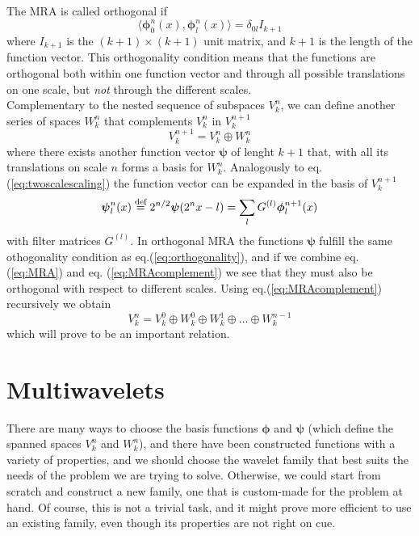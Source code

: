 \noindent
The MRA is called orthogonal if 
\begin{equation}
	\label{eq:orthogonality}
	\langle \boldsymbol{\phi}_0^n(x), \boldsymbol{\phi}_l^n(x) \rangle = 
	\delta_{0l}I_{k+1}
\end{equation}
where $I_{k+1}$ is the $(k+1) \times (k+1)$ unit matrix, and $k+1$ is the 
length of the function vector. This orthogonality condition means that the 
functions are orthogonal both within one function
vector and through all possible translations on one scale, but \emph{not} 
through the different scales.\\

\noindent
Complementary to the nested sequence of subspaces $V^n_k$, we can define 
another series of spaces $W^n_k$ that complements $V^n_k$ in $V^{n+1}_k$
\begin{equation}
	\label{eq:MRAcomplement}
		V^{n+1}_k = V^n_k \oplus W^n_k
\end{equation}
where there exists another function vector $\boldsymbol{\psi}$ of lenght
$k+1$ that, with all its translations on scale $n$ forms a basis for $W^n_k$. 
Analogously to eq.(\ref{eq:twoscalescaling}) the function vector can be expanded 
in the basis of $V^{n+1}_k$
\begin{equation}
	\label{eq:twoscalewavelet}
	\boldsymbol{\psi}^n_l(x) \stackrel{\text{def}}{\hbox{=}} 2^{n/2}\boldsymbol{\psi}(2^nx-l) = 
									\sum_l G^{(l)}\boldsymbol{\phi}_l^{n+1}(x)
\end{equation}
\noindent
with filter matrices $G^{(l)}$. In orthogonal MRA the functions 
$\boldsymbol{\psi}$ fulfill the same othogonality condition as 
eq.(\ref{eq:orthogonality}), and if we combine eq.(\ref{eq:MRA}) and eq.
(\ref{eq:MRAcomplement}) we see that they must also be orthogonal with respect 
to different scales. Using eq.(\ref{eq:MRAcomplement}) recursively we obtain
\begin{equation}
	\label{eq:MRArecursive}
	V^n_k = V^0_k \oplus W^0_k \oplus W^1_k \oplus \dots \oplus W^{n-1}_k
\end{equation}
which will prove to be an important relation.

\section{Multiwavelets}
There are many ways to choose the basis functions $\boldsymbol{\phi}$
and $\boldsymbol{\psi}$ (which define the spanned spaces $V^n_k$ and $W^n_k$),
and there have been constructed functions with a 
variety of properties, and we should choose the wavelet family that best suits
the needs of the problem we are trying to solve. Otherwise, we could start from
scratch and construct a new family, one that is custom-made for the problem at
hand. Of course, this is not a trivial task, and it might prove more efficient 
to use an existing family, even though its properties are not right on cue.\\

